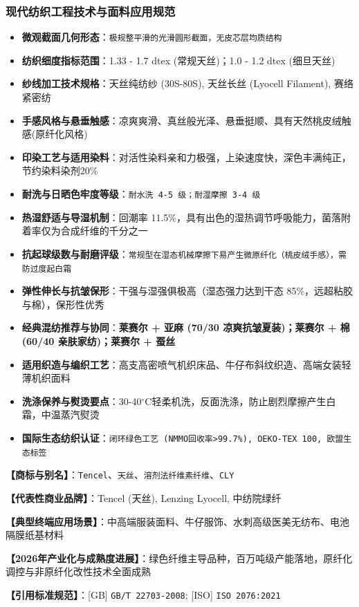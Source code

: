 \documentclass[11pt,openright,twoside,UTF8]{ctexbook}
\begin{document}
\subsubsection*{现代纺织工程技术与面料应用规范}
\begin{itemize} \setlength{\itemsep}{2pt}
    \item \textbf{微观截面几何形态}：\texttt{极规整平滑的光滑圆形截面，无皮芯层均质结构}
    \item \textbf{纺织细度指标范围}：1.33 - 1.7 dtex (常规天丝)；1.0 - 1.2 dtex (细旦天丝)
    \item \textbf{纱线加工技术规格}：天丝纯纺纱 (30S-80S), 天丝长丝 (Lyocell Filament), 赛络紧密纺
    \item \textbf{手感风格与悬垂触感}：凉爽爽滑、真丝般光泽、悬垂挺顺、具有天然桃皮绒触感(原纤化风格)
    \item \textbf{印染工艺与适用染料}：对活性染料亲和力极强，上染速度快，深色丰满纯正，节约染料染剂20\%
    \item \textbf{耐洗与日晒色牢度等级}：\texttt{耐水洗 4-5 级；耐湿摩擦 3-4 级}
    \item \textbf{热湿舒适与导湿机制}：回潮率 11.5\%，具有出色的湿热调节呼吸能力，菌落附着率仅为合成纤维的千分之一
    \item \textbf{抗起球级数与耐磨评级}：\texttt{常规型在湿态机械摩擦下易产生微原纤化（桃皮绒手感），需防过度起白霜}
    \item \textbf{弹性伸长与抗皱保形}：干强与湿强俱极高（湿态强力达到干态 85\%，远超粘胶与棉），保形性优秀
    \item \textbf{经典混纺推荐与协同}：\textbf{莱赛尔 + 亚麻 (70/30 凉爽抗皱夏装)；莱赛尔 + 棉 (60/40 亲肤家纺)；莱赛尔 + 蚕丝}
    \item \textbf{适用织造与编织工艺}：高支高密喷气机织床品、牛仔布斜纹织造、高端女装轻薄机织面料
    \item \textbf{洗涤保养与熨烫要点}：30-40$^\circ\mathrm{C}$轻柔机洗，反面洗涤，防止剧烈摩擦产生白霜，中温蒸汽熨烫
    \item \textbf{国际生态纺织认证}：\texttt{闭环绿色工艺 (NMMO回收率\textgreater{}99.7\%), OEKO-TEX 100, 欧盟生态标签}
\end{itemize}
\vspace{0.2cm}

\noindent\textbf{【商标与别名】}：\texttt{Tencel}、\texttt{天丝}、\texttt{溶剂法纤维素纤维}、\texttt{CLY}\par
\noindent\textbf{【代表性商业品牌】}：Tencel (天丝), Lenzing Lyocell, 中纺院绿纤\par
\noindent\textbf{【典型终端应用场景】}：中高端服装面料、牛仔服饰、水刺高级医美无纺布、电池隔膜纸基材料\par
\noindent\textbf{【2026年产业化与成熟度进展】}：绿色纤维主导品种，百万吨级产能落地，原纤化调控与非原纤化改性技术全面成熟\par
\noindent\textbf{【引用标准规范】}：[GB] \texttt{GB/T 22703-2008}; [ISO] \texttt{ISO 2076:2021}\par
\vspace{0.5cm}
\end{document}
